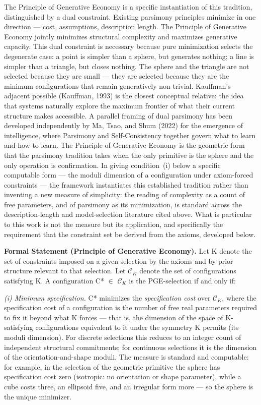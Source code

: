 \documentclass[11pt,oneside]{report}
\theoremstyle{definition}
\theoremstyle{remark}
\begin{document}
The Principle of Generative Economy is a specific instantiation of this
tradition, distinguished by a dual constraint. Existing parsimony
principles minimize in one direction --- cost, assumptions, description
length. The Principle of Generative Economy jointly minimizes structural
complexity and maximizes generative capacity. This dual constraint is
necessary because pure minimization selects the degenerate case: a point
is simpler than a sphere, but generates nothing; a line is simpler than
a triangle, but closes nothing. The sphere and the triangle are not
selected because they are small --- they are selected because they are
the minimum configurations that remain generatively non-trivial.
Kauffman's adjacent possible (Kauffman, 1993) is the closest conceptual
relative: the idea that systems naturally explore the maximum frontier
of what their current structure makes accessible. A parallel framing of
dual parsimony has been developed independently by Ma, Tsao, and Shum
(2022) for the emergence of intelligence, where Parsimony and
Self-Consistency together govern what to learn and how to learn. The
Principle of Generative Economy is the geometric form that the parsimony
tradition takes when the only primitive is the sphere and the only
operation is confirmation. In giving condition~(i) below a specific
computable form --- the moduli dimension of a configuration under
axiom-forced constraints --- the framework instantiates this established
tradition rather than inventing a new measure of simplicity: the reading
of complexity as a count of free parameters, and of parsimony as its
minimization, is standard across the description-length and
model-selection literature cited above. What is particular to this work
is not the measure but its application, and specifically the requirement
that the constraint set be derived from the axioms, developed below.

\textbf{Formal Statement (Principle of Generative Economy).} Let K
denote the set of constraints imposed on a given selection by the axioms
and by prior structure relevant to that selection. Let \ensuremath{\mathcal{C}_{K}} denote the
set of configurations satisfying K. A configuration C* \ensuremath{\in} \ensuremath{\mathcal{C}_{K}} is the
PGE-selection if and only if:

\emph{(i) Minimum specification.} C* minimizes the \emph{specification cost}
over \ensuremath{\mathcal{C}_{K}}, where the specification cost of a configuration is the number of
free real parameters required to fix it beyond what K forces --- that is, the
dimension of the space of K-satisfying configurations equivalent to it under the
symmetry K permits (its moduli dimension). For discrete selections this reduces
to an integer count of independent structural commitments; for continuous
selections it is the dimension of the orientation-and-shape moduli. The measure
is standard and computable: for example, in the selection of the geometric
primitive the sphere has specification cost zero (isotropic: no orientation or
shape parameter), while a cube costs three, an ellipsoid five, and an irregular
form more --- so the sphere is the unique minimizer.
\end{document}

